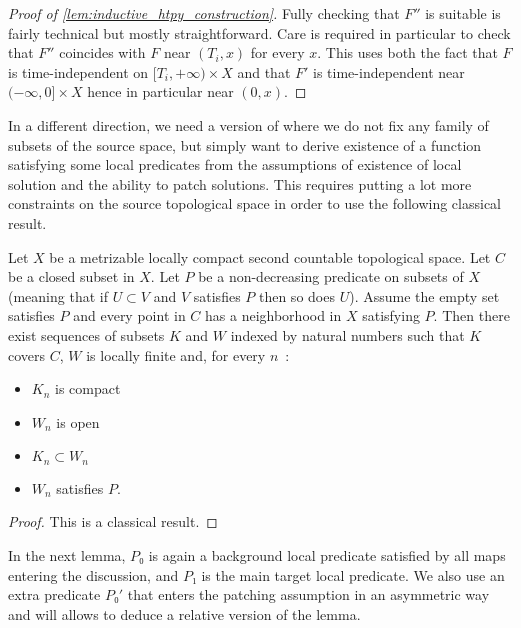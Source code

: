 \begin{proof}[Proof of \cref{lem:inductive_htpy_construction}]
  Fully checking that $F''$ is suitable is fairly technical but mostly straightforward.
  Care is required in particular to check that $F''$ coincides with $F$ near
  $(T_i, x)$ for every $x$. This uses both the fact that $F$ is time-independent on
  $[T_i, + ∞) × X$ and that $F'$ is time-independent near $(-∞, 0] × X$ hence in particular
  near $(0, x)$.
\end{proof}

In a different direction, we need a version of  where
we do not fix any family of subsets of the source space, but simply want to derive existence
of a function satisfying some local predicates from the assumptions of
existence of local solution and the ability to patch solutions. This requires putting a lot
more constraints on the source topological space in order to use the following classical
result.

\begin{lemma}
  \label{lem:exists_locally_finite_subcover_of_locally}
  \leanok
  Let $X$ be a metrizable locally compact second countable topological space.
  Let $C$ be a closed subset in $X$. Let $P$ be a non-decreasing predicate on subsets
  of $X$ (meaning that if $U ⊂ V$ and $V$ satisfies $P$ then so does $U$). Assume
  the empty set satisfies $P$ and every point in $C$ has a neighborhood in $X$
  satisfying $P$. Then there exist sequences of subsets $K$ and $W$ indexed by
  natural numbers such that $K$ covers $C$, $W$ is locally finite and, for every $n$~:
  \begin{itemize}
    \item $K_n$ is compact
    \item $W_n$ is open
    \item $K_n ⊂ W_n$
    \item $W_n$ satisfies $P$.
  \end{itemize}
\end{lemma}

\begin{proof}
  \leanok
  This is a classical result.
\end{proof}

In the next lemma, $P₀$ is again a background local predicate satisfied by all
maps entering the discussion, and $P₁$ is the main target local predicate. We also use
an extra predicate $P₀'$ that enters the patching assumption in an asymmetric way
and will allows to deduce a relative version of the lemma.

